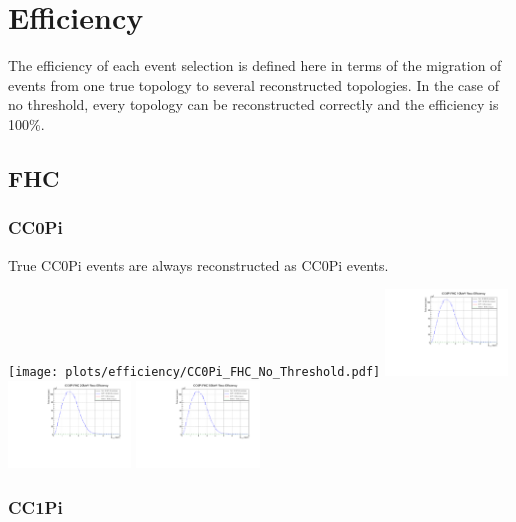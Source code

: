 \section{Efficiency}

The efficiency of each event selection is defined here in terms of the migration of events from one true topology to several reconstructed topologies.  In the case of no threshold, every topology can be reconstructed correctly and the efficiency is 100\%.  

\subsection{FHC}

\subsubsection{CC0Pi}

True CC0Pi events are always reconstructed as CC0Pi events.

\begin{center}

\texttt{[image: plots/efficiency/CC0Pi\_FHC\_No\_Threshold.pdf]}
\includegraphics[width=0.245\textwidth]{plots/efficiency/CC0Pi_FHC_10MeV.pdf} 
\includegraphics[width=0.245\textwidth]{plots/efficiency/CC0Pi_FHC_20MeV.pdf}
\includegraphics[width=0.245\textwidth]{plots/efficiency/CC0Pi_FHC_50MeV.pdf}

\end{center}

\subsubsection{CC1Pi}

